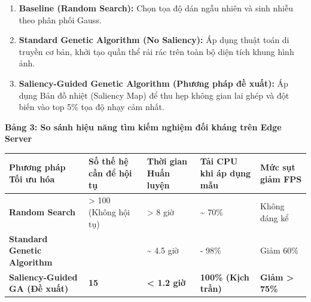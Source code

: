 \documentclass[a4paper,fleqn]{cas-dc}
\begin{document}
\begin{enumerate}
\def\labelenumi{\arabic{enumi}.}
\item
  \textbf{Baseline (Random Search):} Chọn tọa độ dán ngẫu nhiên và sinh
  nhiễu theo phân phối Gauss.
\item
  \textbf{Standard Genetic Algorithm (No Saliency):} Áp dụng thuật toán
  di truyền cơ bản, khởi tạo quần thể rải rác trên toàn bộ diện tích
  khung hình ảnh.
\item
  \textbf{Saliency-Guided Genetic Algorithm (Phương pháp đề xuất):} Áp
  dụng Bản đồ nhiệt (Saliency Map) để thu hẹp không gian lai ghép và đột
  biến vào top 5\% tọa độ nhạy cảm nhất.
\end{enumerate}

\textbf{Bảng 3: So sánh hiệu năng tìm kiếm nghiệm đối kháng trên Edge
Server}

\begin{table}[t]
\centering
\small
\begin{tabular}{@{}
  >{\raggedright\arraybackslash}p{}
  >{\raggedright\arraybackslash}p{}
  >{\raggedright\arraybackslash}p{}
  >{\raggedright\arraybackslash}p{}
  >{\raggedright\arraybackslash}p{}@{}}
\toprule\noalign{}
\begin{minipage}[b]{\linewidth}\raggedright
\textbf{Phương pháp Tối ưu hóa}
\end{minipage} & \begin{minipage}[b]{\linewidth}\raggedright
\textbf{Số thế hệ cần để hội tụ}
\end{minipage} & \begin{minipage}[b]{\linewidth}\raggedright
\textbf{Thời gian Huấn luyện}
\end{minipage} & \begin{minipage}[b]{\linewidth}\raggedright
\textbf{Tải CPU khi áp dụng mẫu}
\end{minipage} & \begin{minipage}[b]{\linewidth}\raggedright
\textbf{Mức sụt giảm FPS}
\end{minipage} \\
\midrule\noalign{}

\bottomrule\noalign{}

\textbf{Random Search} & \textgreater{} 100 (Không hội tụ) &
\textgreater{} 8 giờ & \textasciitilde{} 70\% & Không đáng kể \\
\textbf{Standard Genetic Algorithm} & 52 & \textasciitilde{} 4.5 giờ &
95 - 98\% & Giảm 60\% \\
\textbf{Saliency-Guided GA (Đề xuất)} & \textbf{15} &
\textbf{\textless{} 1.2 giờ} & \textbf{100\% (Kịch trần)} & \textbf{Giảm
\textgreater{} 75\%} \\
\end{tabular}
\end{table}
\end{document}
